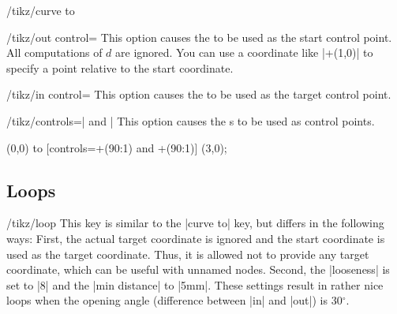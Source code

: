 \begin{key}{/tikz/curve to}
  \begin{key}{/tikz/out control=}
    This option causes the  to be used as the start
    control point. All computations of $d$ are ignored. You can use a
    coordinate like |+(1,0)| to specify a point relative to the start
    coordinate.
  \end{key}
  \begin{key}{/tikz/in control=}
    This option causes the  to be used as the target
    control point.
  \end{key}
  \begin{key}{/tikz/controls=| and |}
    This option causes the s to be used as control
    points.
\begin{codeexample}[]
\tikz \draw (0,0) to [controls=+(90:1) and +(90:1)] (3,0);
\end{codeexample}
  \end{key}
\end{key}


\subsection{Loops}

\begin{key}{/tikz/loop}
  This key is similar to the |curve to| key, but differs in the
  following ways: First, the actual target coordinate is ignored and the
  start coordinate is used as the target coordinate. Thus, it is
  allowed not to provide any target coordinate, which can be useful
  with unnamed nodes. Second, the |looseness| is set to |8| and the
  |min distance| to |5mm|. These settings result in rather nice loops
  when the opening angle (difference between |in| and |out|) is
  30$^\circ$.
\begin{codeexample}[]
\end{codeexample}
\end{key}

